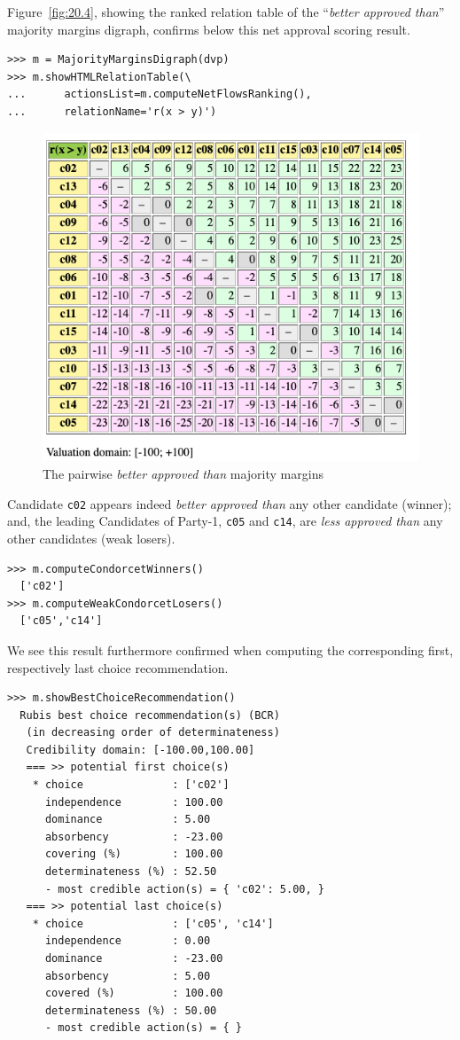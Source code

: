 Figure~\vref{fig:20.4}, showing the \NetFlows ranked relation table of the ``\emph{better approved than}'' majority margins digraph, confirms below this net approval scoring result.
\begin{lstlisting}
>>> m = MajorityMarginsDigraph(dvp)
>>> m.showHTMLRelationTable(\
...      actionsList=m.computeNetFlowsRanking(),
...      relationName='r(x > y)')
\end{lstlisting}	   
\begin{figure}[ht]
\includegraphics[width=0.8\hsize]{Figures/20-4-majMargDAV.png}
\caption{The pairwise \emph{better approved than} majority margins} 
\label{fig:20.4}       %
\end{figure}

Candidate \texttt{c02} appears indeed \emph{better approved than} any other candidate (\Condorcet winner); and, the leading Candidates of Party-1, \texttt{c05} and \texttt{c14}, are \emph{less approved than} any other candidates (weak \Condorcet losers).
\begin{lstlisting}
>>> m.computeCondorcetWinners()
  ['c02']
>>> m.computeWeakCondorcetLosers()
  ['c05','c14']
\end{lstlisting}

We see this result furthermore confirmed when computing the corresponding first, respectively last choice recommendation.    
\begin{lstlisting}
>>> m.showBestChoiceRecommendation()
  Rubis best choice recommendation(s) (BCR)
   (in decreasing order of determinateness)   
   Credibility domain: [-100.00,100.00]
   === >> potential first choice(s)
    * choice              : ['c02']
      independence        : 100.00
      dominance           : 5.00
      absorbency          : -23.00
      covering (%)        : 100.00
      determinateness (%) : 52.50
      - most credible action(s) = { 'c02': 5.00, }
   === >> potential last choice(s) 
    * choice              : ['c05', 'c14']
      independence        : 0.00
      dominance           : -23.00
      absorbency          : 5.00
      covered (%)         : 100.00
      determinateness (%) : 50.00
      - most credible action(s) = { }
\end{lstlisting}

